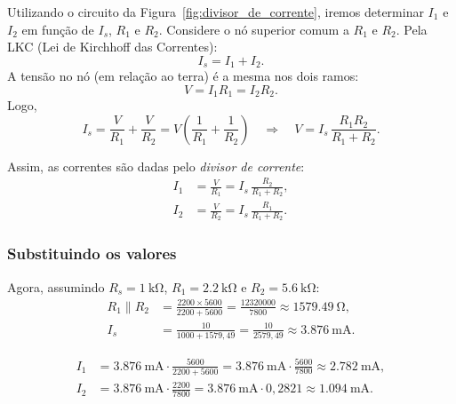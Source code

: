 \documentclass[a4paper, 12pt]{article}
\begin{document}

Utilizando o circuito da Figura~\ref{fig:divisor_de_corrente}, iremos determinar $I_1$ e $I_2$ em função de $I_s$, $R_1$ e $R_2$. Considere o nó superior comum a $R_1$ e $R_2$. Pela LKC (Lei de Kirchhoff das Correntes):
\begin{equation}
I_s = I_1 + I_2.
\end{equation}
A tensão no nó (em relação ao terra) é a mesma nos dois ramos:
\begin{equation}
V = I_1 R_1 = I_2 R_2.
\end{equation}
Logo,
\begin{equation}
I_s = \frac{V}{R_1} + \frac{V}{R_2}
= V\!\left(\frac{1}{R_1} + \frac{1}{R_2}\right)
\quad\Rightarrow\quad
V = I_s\,\frac{R_1 R_2}{R_1 + R_2}.
\end{equation}

Assim, as correntes são dadas pelo \emph{divisor de corrente}:
\begin{align}
I_1 &= \frac{V}{R_1} = I_s\,\frac{R_2}{R_1 + R_2},\\[6pt]
I_2 &= \frac{V}{R_2} = I_s\,\frac{R_1}{R_1 + R_2}.
\end{align}

\subsubsection{Substituindo os valores}
Agora, assumindo $R_{s} = \SI{1}{\kilo\ohm}$, $R_{1} = \SI{2.2}{\kilo\ohm}$ e $R_{2} = \SI{5.6}{\kilo\ohm}$:\\[3pt]

\begin{align}
R_1 \parallel R_2 &= \frac{2200 \times 5600}{2200 + 5600} 
= \frac{12320000}{7800} \approx \SI{1579,49}{\ohm}, \\[6pt] 
I_s &= \frac{10}{1000 + 1579,49} 
= \frac{10}{2579,49} 
\approx \SI{3,876}{\milli\ampere}.
\end{align}

\begin{align*}
I_1 &= \SI{3,876}{\milli\ampere} \cdot \frac{5600}{2200 + 5600} 
= \SI{3,876}{\milli\ampere} \cdot \frac{5600}{7800} 
\approx \SI{2,782}{\milli\ampere}, \\[6pt]
I_2 &= \SI{3,876}{\milli\ampere} \cdot \frac{2200}{7800} 
= \SI{3,876}{\milli\ampere} \cdot 0,2821 
\approx \SI{1,094}{\milli\ampere}.
\end{align*}
\end{document}
